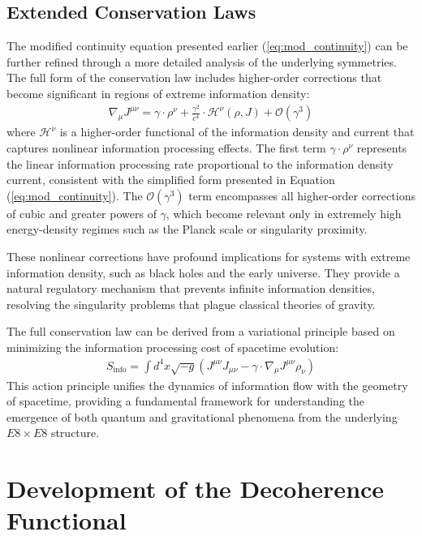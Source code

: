 \documentclass[11pt,english,twoside]{article}
\begin{document}
\subsection{Extended Conservation Laws}

The modified continuity equation presented earlier (\ref{eq:mod_continuity}) can be further refined through a more detailed analysis of the underlying symmetries. The full form of the conservation law includes higher-order corrections that become significant in regions of extreme information density:
\begin{align}
    \nabla_\mu J^{\mu\nu} = \gamma \cdot \rho^{\nu} + \frac{\gamma^2}{c^4} \cdot \mathcal{H}^{\nu}(\rho, J) + \mathcal{O}(\gamma^3)
\end{align}
where $\mathcal{H}^{\nu}$ is a higher-order functional of the information density and current that captures nonlinear information processing effects. The first term $\gamma \cdot \rho^{\nu}$ represents the linear information processing rate proportional to the information density current, consistent with the simplified form presented in Equation (\ref{eq:mod_continuity}). The $\mathcal{O}(\gamma^3)$ term encompasses all higher-order corrections of cubic and greater powers of $\gamma$, which become relevant only in extremely high energy-density regimes such as the Planck scale or singularity proximity.

These nonlinear corrections have profound implications for systems with extreme information density, such as black holes and the early universe. They provide a natural regulatory mechanism that prevents infinite information densities, resolving the singularity problems that plague classical theories of gravity.

The full conservation law can be derived from a variational principle based on minimizing the information processing cost of spacetime evolution:
\begin{align}
    S_{\text{info}} = \int d^4x \sqrt{-g} \left(J^{\mu\nu}J_{\mu\nu} - \gamma \cdot \nabla_\mu J^{\mu\nu} \rho_\nu\right)
\end{align}
This action principle unifies the dynamics of information flow with the geometry of spacetime, providing a fundamental framework for understanding the emergence of both quantum and gravitational phenomena from the underlying $E8\times E8$ structure.

\section{Development of the Decoherence Functional}
\end{document}
